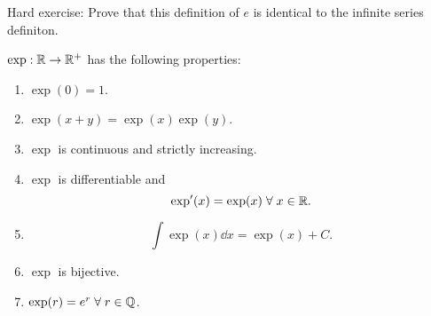 Hard exercise: Prove that this definition of $e$ is identical to the infinite series definiton.

\begin{thm}[] \label{thm:}
    $\exp : \mathbb{R} \to \mathbb{R}^{+}$ has the following properties:
    \begin{enumerate}[label=(\alph*)]
        \item $\exp(0) = 1$.
        \item $\exp(x + y) = \exp(x) \exp(y)$.
        \item $\exp$ is continuous and strictly increasing.
        \item $\exp$ is differentiable and \[
            \exp'(x) = \exp(x) \;\forall\; x \in \mathbb{R}.
        \]
        \item \[
            \int \exp(x) \dd x = \exp(x) + C.
        \]
        \item $\exp$ is bijective.
        \item $\exp(r) = e^{r} \;\forall\; r \in \mathbb{Q}$.
    \end{enumerate}
\end{thm}
